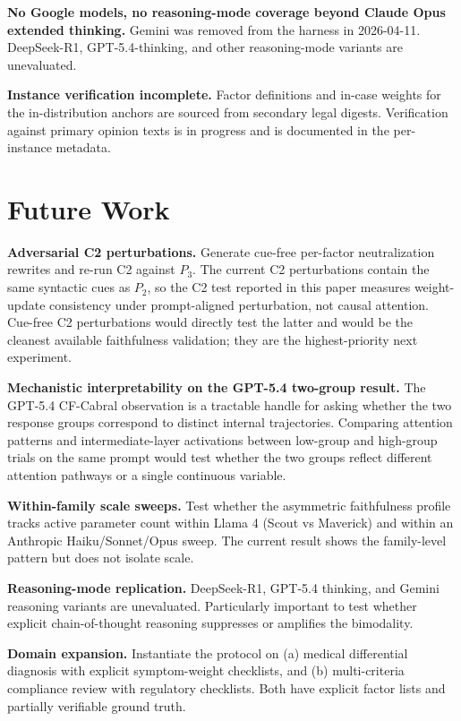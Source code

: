 \documentclass[11pt]{article}
\begin{document}
\textbf{No Google models, no reasoning-mode coverage beyond Claude Opus extended thinking.} Gemini was removed from the harness in 2026-04-11. DeepSeek-R1, GPT-5.4-thinking, and other reasoning-mode variants are unevaluated.

\textbf{Instance verification incomplete.} Factor definitions and in-case weights for the in-distribution anchors are sourced from secondary legal digests. Verification against primary opinion texts is in progress and is documented in the per-instance metadata.

\section{Future Work}
\label{sec:future}

\textbf{Adversarial C2 perturbations.} Generate cue-free per-factor neutralization rewrites and re-run C2 against $P_3$. The current C2 perturbations contain the same syntactic cues as $P_2$, so the C2 test reported in this paper measures weight-update consistency under prompt-aligned perturbation, not causal attention. Cue-free C2 perturbations would directly test the latter and would be the cleanest available faithfulness validation; they are the highest-priority next experiment.

\textbf{Mechanistic interpretability on the GPT-5.4 two-group result.} The GPT-5.4 CF-Cabral observation is a tractable handle for asking whether the two response groups correspond to distinct internal trajectories. Comparing attention patterns and intermediate-layer activations between low-group and high-group trials on the same prompt would test whether the two groups reflect different attention pathways or a single continuous variable.

\textbf{Within-family scale sweeps.} Test whether the asymmetric faithfulness profile tracks active parameter count within Llama 4 (Scout vs Maverick) and within an Anthropic Haiku/Sonnet/Opus sweep. The current result shows the family-level pattern but does not isolate scale.

\textbf{Reasoning-mode replication.} DeepSeek-R1, GPT-5.4 thinking, and Gemini reasoning variants are unevaluated. Particularly important to test whether explicit chain-of-thought reasoning suppresses or amplifies the bimodality.

\textbf{Domain expansion.} Instantiate the protocol on (a) medical differential diagnosis with explicit symptom-weight checklists, and (b) multi-criteria compliance review with regulatory checklists. Both have explicit factor lists and partially verifiable ground truth.
\end{document}
